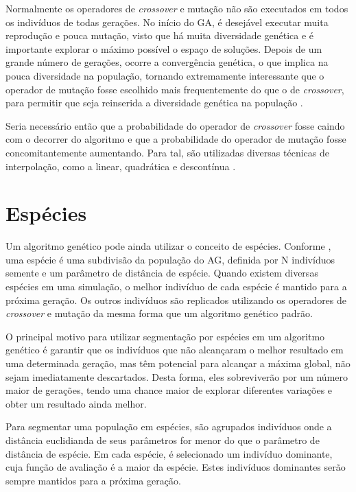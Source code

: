 \documentclass[12pt,oneside,a4paper,english,french,spanish,brazil,]{abntex2}
\begin{document}
Normalmente os operadores de \textit{crossover} e mutação não são executados em todos os indivíduos de todas gerações. No início do GA, é desejável executar muita reprodução e pouca mutação, visto que há muita diversidade genética e é importante explorar o máximo possível o espaço de soluções. Depois de um grande número de gerações, ocorre a convergência genética, o que implica na pouca diversidade na população, tornando extremamente interessante que o operador de mutação fosse escolhido mais frequentemente do que o de \textit{crossover}, para permitir que seja reinserida a diversidade genética na população \cite{linden:2008}.

Seria necessário então que a probabilidade do operador de \textit{crossover} fosse caindo com o decorrer do algoritmo e que a probabilidade do operador de mutação fosse concomitantemente aumentando. Para tal, são utilizadas diversas técnicas de interpolação, como a linear, quadrática e descontínua \cite{linden:2008}.

\section{Espécies}

Um algoritmo genético pode ainda utilizar o conceito de espécies. Conforme \citet{li:2002}, uma espécie é uma subdivisão da população do AG, definida por N indivíduos semente e um parâmetro de distância de espécie. Quando existem diversas espécies em uma simulação, o melhor indivíduo de cada espécie é mantido para a próxima geração. Os outros indivíduos são replicados utilizando os operadores de \textit{crossover} e mutação da mesma forma que um algoritmo genético padrão.

O principal motivo para utilizar segmentação por espécies em um algoritmo genético é garantir que os indivíduos que não alcançaram o melhor resultado em uma determinada geração, mas têm potencial para alcançar a máxima global, não sejam imediatamente descartados. Desta forma, eles sobreviverão por um número maior de gerações, tendo uma chance maior de explorar diferentes variações e obter um resultado ainda melhor.

Para segmentar uma população em espécies, são agrupados indivíduos onde a distância euclidianda de seus parâmetros for menor do que o parâmetro de distância de espécie. Em cada espécie, é selecionado um indivíduo dominante, cuja função de avaliação é a maior da espécie. Estes indivíduos dominantes serão sempre mantidos para a próxima geração.
\end{document}
